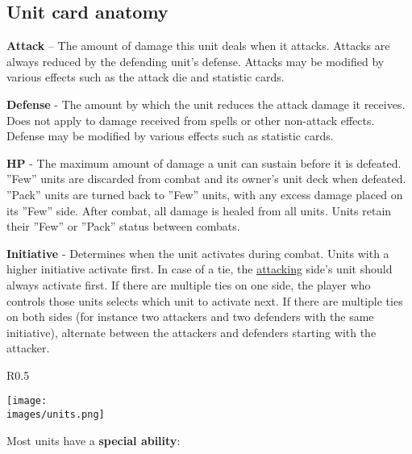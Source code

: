 \subsection*{Unit card anatomy}

\textbf{Attack} – The amount of damage this unit deals when it attacks.
Attacks are always reduced by the defending unit’s defense.
Attacks may be modified by various effects such as the attack die and statistic cards.\par
\textbf{Defense} - The amount by which the unit reduces the attack damage it receives.
Does not apply to damage received from spells or other non-attack effects.
Defense may be modified by various effects such as statistic cards.\par
\textbf{\hypertarget{HP}{HP}} - The maximum amount of damage a unit can sustain before it is defeated.
”Few” units are discarded from combat and its owner’s unit deck when defeated.
”Pack” units are turned back to ”Few” units, with any excess damage placed on its ”Few” side.
After combat, all damage is healed from all units.
Units retain their ”Few” or ”Pack” status between combats.\par
{\hypertarget{Initiative}{\textbf{Initiative}}} - Determines when the unit activates during combat.
Units with a higher initiative activate first.
In case of a tie, the \hyperlink{Combatterminology}{attacking} side’s unit should always activate first.
If there are multiple ties on one side, the player who controls those units selects which unit to activate next.
If there are multiple ties on both sides (for instance two attackers and two defenders with the same initiative), alternate between the attackers and defenders starting with the attacker.\par
\begin{wrapfigure}{R}{0.5\textwidth}
  \begin{center}
  \texttt{[image: \\images/units.png]}
  \end{center}
\end{wrapfigure}
Most units have a \textbf{special ability}:\par

